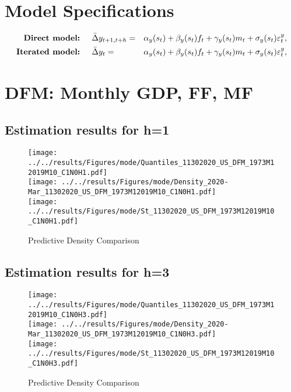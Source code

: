\documentclass[12pt]{article}
\numberwithin{table}{subsection}
\numberwithin{figure}{section}
\begin{document}
\section{Model Specifications}
\begin{eqnarray*}
	\mbox{\textbf{Direct model:}
	} \quad & {\bar{\Delta} {y}_{t+1,t+h}} =& {\alpha_y} ({s_t}) + {\beta_y} ({s_t}) {f_t} + {\gamma_y} ({s_t}) m_t + {\sigma_y} ({s_t}) \varepsilon^y_t, \label{eq:MS_direct} \\
	\mbox{\textbf{Iterated model:}
	} \quad & {\bar{\Delta} {y}_{t}} =& {\alpha_y} ({s_t}) + {\beta_y} ({s_t}) {f_t} + {\gamma_y} ({s_t}) m_t + {\sigma_y} ({s_t}) \varepsilon^y_t, \label{eq:MS_direct}
\end{eqnarray*}

\section{DFM: Monthly GDP, FF, MF}
\subsection{Estimation results for h=1}

\begin{figure}[htb!]
	\caption{Predictive Density Comparison}
	\centering
	\texttt{[image: ../../results/Figures/mode/Quantiles\_11302020\_US\_DFM\_1973M12019M10\_C1N0H1.pdf]} \\
	\texttt{[image: ../../results/Figures/mode/Density\_2020-Mar\_11302020\_US\_DFM\_1973M12019M10\_C1N0H1.pdf]}\\
	\texttt{[image: ../../results/Figures/mode/St\_11302020\_US\_DFM\_1973M12019M10\_C1N0H1.pdf]}
\end{figure}

\clearpage
\subsection{Estimation results for h=3}

\begin{figure}[htb!]
	\caption{Predictive Density Comparison}
	\centering
	\texttt{[image: ../../results/Figures/mode/Quantiles\_11302020\_US\_DFM\_1973M12019M10\_C1N0H3.pdf]}\\
	\texttt{[image: ../../results/Figures/mode/Density\_2020-Mar\_11302020\_US\_DFM\_1973M12019M10\_C1N0H3.pdf]}\\
	\texttt{[image: ../../results/Figures/mode/St\_11302020\_US\_DFM\_1973M12019M10\_C1N0H3.pdf]}
\end{figure}
\end{document}
